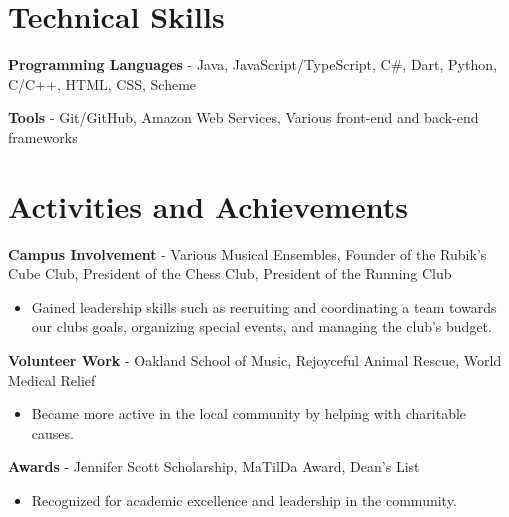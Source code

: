 \documentclass{article}
\newcommand{\resumesection}[1]{
	\section*{\Large\textbf{#1}}
	\hrulefill
	\vspace{1ex}
}
\begin{document}


\resumesection{Technical Skills}

\vspace{.2ex}

\textbf{Programming Languages} -  Java, JavaScript/TypeScript, C\#, Dart, Python, C/C++, HTML, CSS, Scheme


\textbf{Tools} - Git/GitHub, Amazon Web Services, Various front-end and back-end frameworks %

\vspace{.5ex}


\resumesection{Activities and Achievements}

\vspace{.2ex}

\textbf {Campus Involvement} - Various Musical Ensembles, Founder of the Rubik's Cube Club, President of the Chess Club, President of the Running Club


	\begin{itemize}
		\item Gained leadership skills such as recruiting and coordinating a team towards our clubs goals, organizing special events, and managing the club's budget.
	\end{itemize}

\textbf {Volunteer Work} - Oakland School of Music, Rejoyceful Animal Rescue, World Medical Relief

	\begin{itemize}
		\item Became more active in the local community by helping with charitable causes.
	\end{itemize}

\textbf {Awards} - Jennifer Scott Scholarship, MaTilDa Award, Dean's List

	\begin{itemize}
		\item Recognized for academic excellence and leadership in the community.
	\end{itemize}
\end{document}
